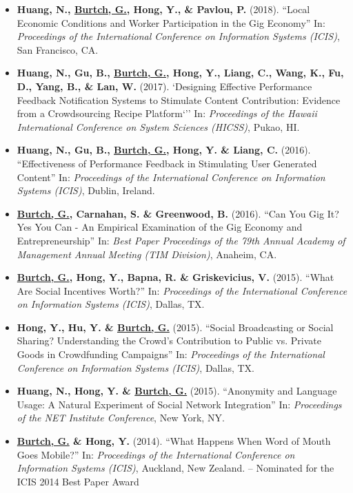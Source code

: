 \documentclass[10.5pt,letterpaper,sans]{moderncv}        %
\begin{document}
\begin{itemize}
\item \textbf{Huang, N., \underline{Burtch, G.}, Hong, Y., \& Pavlou, P.} (2018). ``Local Economic Conditions and Worker Participation in the Gig Economy'' In: \textit{Proceedings of the International Conference on Information Systems (ICIS)}, San Francisco, CA.

\item \textbf{Huang, N., Gu, B., \underline{Burtch, G.}, Hong, Y., Liang, C., Wang, K., Fu, D., Yang, B., \& Lan, W.} (2017). `Designing Effective Performance Feedback Notification Systems to Stimulate Content Contribution: Evidence from a Crowdsourcing Recipe Platform`'' In: \textit{Proceedings of the Hawaii International Conference on System Sciences (HICSS)}, Pukao, HI.

\item \textbf{Huang, N., Gu, B., \underline{Burtch, G.}, Hong, Y. \& Liang, C.} (2016). ``Effectiveness of Performance Feedback in Stimulating User Generated Content'' In: \textit{Proceedings of the International Conference on Information Systems (ICIS)}, Dublin, Ireland.

\item \textbf{\underline{Burtch, G.}, Carnahan, S. \& Greenwood, B.} (2016). ``Can You Gig It? Yes You Can - An Empirical Examination of the Gig Economy and Entrepreneurship'' In: \textit{Best Paper Proceedings of the 79th Annual Academy of Management Annual Meeting (TIM Division)}, Anaheim, CA.

\item \textbf{\underline{Burtch, G.}, Hong, Y., Bapna, R. \& Griskevicius, V.} (2015). ``What Are Social Incentives Worth?'' In: \textit{Proceedings of the International Conference on Information Systems (ICIS)}, Dallas, TX.

\item \textbf{Hong, Y., Hu, Y. \& \underline{Burtch, G.}} (2015). ``Social Broadcasting or Social Sharing? Understanding the Crowd's Contribution to Public vs. Private Goods in Crowdfunding Campaigns'' In: \textit{Proceedings of the International Conference on Information Systems (ICIS)}, Dallas, TX.

\item \textbf{Huang, N., Hong, Y. \& \underline{Burtch, G.}} (2015). ``Anonymity and Language Usage: A Natural Experiment of Social Network Integration'' In: \textit{Proceedings of the NET Institute Conference}, New York, NY.

\item \textbf{\underline{Burtch, G.} \& Hong, Y.} (2014). ``What Happens When Word of Mouth Goes Mobile?'' In: \textit{Proceedings of the International Conference on Information Systems (ICIS)}, Auckland, New Zealand. \newline-- Nominated for the ICIS 2014 Best Paper Award


\end{itemize}
\end{document}

